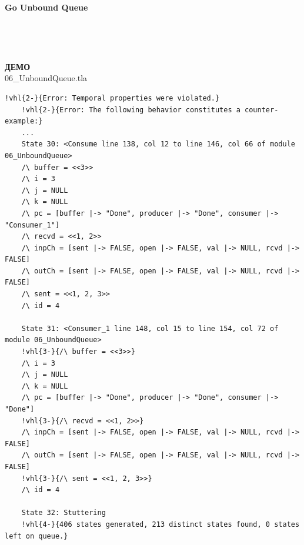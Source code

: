 \documentclass[
  11pt,aspectratio=1610,pdf,hyperref={unicode,colorlinks=false}
]{beamer}
\begin{document}
\begin{frame}[t,fragile]
  \begin{minipage}{\textwidth}
      \centering%
      {\Large\bf Go Unbound Queue\\}~%
  \end{minipage}\\[2ex]%
  \begin{minipage}{\textwidth}
    \begin{columns}[T]
      \begin{column}{.5\textwidth}
      \end{column}
      \begin{column}{.5\textwidth}
      \end{column}
    \end{columns}
  \end{minipage}
\end{frame}

\begin{frame}[c]
  \centering
  {\Large\bf ДЕМО}\\[2ex]
  {\normalsize\ttfamily\textcolor{black!80}{06\_UnboundQueue.tla}}
\end{frame}

\begin{frame}[c,fragile]
  \begin{tcolorbox}[colback=shellbgcolor,boxrule=.25pt]%
  \centering\tiny%
  \begin{Verbatim}[commandchars=!\{\}]
    !vhl{2-}{Error: Temporal properties were violated.}
    !vhl{2-}{Error: The following behavior constitutes a counter-example:}
    ...
    State 30: <Consume line 138, col 12 to line 146, col 66 of module 06_UnboundQueue>
    /\ buffer = <<3>>
    /\ i = 3
    /\ j = NULL
    /\ k = NULL
    /\ pc = [buffer |-> "Done", producer |-> "Done", consumer |-> "Consumer_1"]
    /\ recvd = <<1, 2>>
    /\ inpCh = [sent |-> FALSE, open |-> FALSE, val |-> NULL, rcvd |-> FALSE]
    /\ outCh = [sent |-> FALSE, open |-> FALSE, val |-> NULL, rcvd |-> FALSE]
    /\ sent = <<1, 2, 3>>
    /\ id = 4
    
    State 31: <Consumer_1 line 148, col 15 to line 154, col 72 of module 06_UnboundQueue>
    !vhl{3-}{/\ buffer = <<3>>}
    /\ i = 3
    /\ j = NULL
    /\ k = NULL
    /\ pc = [buffer |-> "Done", producer |-> "Done", consumer |-> "Done"]
    !vhl{3-}{/\ recvd = <<1, 2>>}
    /\ inpCh = [sent |-> FALSE, open |-> FALSE, val |-> NULL, rcvd |-> FALSE]
    /\ outCh = [sent |-> FALSE, open |-> FALSE, val |-> NULL, rcvd |-> FALSE]
    !vhl{3-}{/\ sent = <<1, 2, 3>>}
    /\ id = 4
    
    State 32: Stuttering
    !vhl{4-}{406 states generated, 213 distinct states found, 0 states left on queue.}
  \end{Verbatim}
\end{tcolorbox}
\end{frame}
\end{document}
